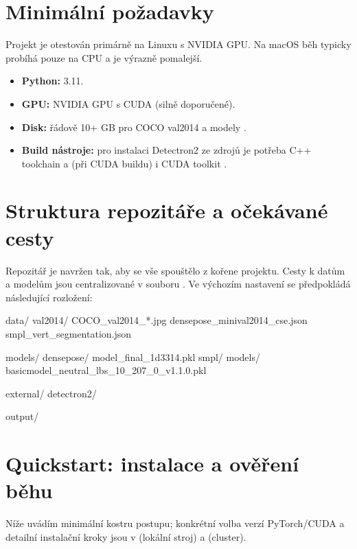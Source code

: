 \documentclass[11pt,a4paper,twoside,openright]{report}
\begin{document}
\section{Minimální požadavky}

Projekt je otestován primárně na Linuxu s NVIDIA GPU. Na macOS běh typicky probíhá pouze na CPU a je výrazně pomalejší.

\begin{itemize}
    \item \textbf{Python:} 3.11.
    \item \textbf{GPU:} NVIDIA GPU s CUDA (silně doporučené).
    \item \textbf{Disk:} řádově 10+ GB pro COCO val2014 a modely \cite{lin2014microsoft}.
    \item \textbf{Build nástroje:} pro instalaci Detectron2 ze zdrojů je potřeba C++ toolchain a (při CUDA buildu) i CUDA toolkit \cite{wu2019detectron2}.
\end{itemize}

\section{Struktura repozitáře a očekávané cesty}

Repozitář je navržen tak, aby se vše spouštělo z kořene projektu. Cesty k datům a modelům jsou centralizované v souboru . Ve výchozím nastavení se předpokládá následující rozložení:

\begin{codeblock}
data/
  val2014/
    COCO_val2014_*.jpg
  densepose_minival2014_cse.json
  smpl_vert_segmentation.json

models/
  densepose/
    model_final_1d3314.pkl
  smpl/
    models/
      basicmodel_neutral_lbs_10_207_0_v1.1.0.pkl

external/
  detectron2/

output/
\end{codeblock}

\section{Quickstart: instalace a ověření běhu}

Níže uvádím minimální kostru postupu; konkrétní volba verzí PyTorch/CUDA a detailní instalační kroky jsou v  (lokální stroj) a  (cluster).
\end{document}
